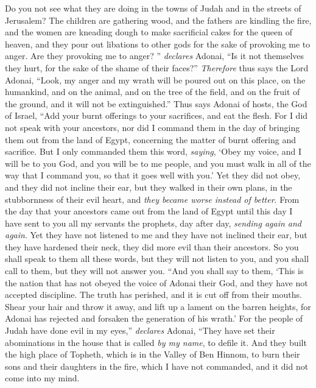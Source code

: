 \begin{biblechapter}
\verse Do you not see what they are doing in the towns of Judah and in the streets of Jerusalem?
\verse The children are gathering wood, and the fathers are kindling the fire, and the women are kneading dough to make sacrificial cakes for the queen of heaven, and they pour out libations to other gods for the sake of provoking me to anger.
\verse Are they provoking me to anger? ” \textit{declares} Adonai, “Is it not themselves they hurt, for the sake of the shame of their faces?”
\verse \textit{Therefore} thus says the Lord Adonai, “Look, my anger and my wrath will be poured out on this place, on the humankind, and on the animal, and on the tree of the field, and on the fruit of the ground, and it will not be extinguished.”
\verse Thus says Adonai of hosts, the God of Israel, “Add your burnt offerings to your sacrifices, and eat the flesh.
\verse For I did not speak with your ancestors, nor did I command them in the day of bringing them out from the land of Egypt, concerning the matter of burnt offering and sacrifice.
\verse But I only commanded them this word, \textit{saying}, ‘Obey my voice, and I will be to you God, and you will be to me people, and you must walk in all of the way that I command you, so that it goes well with you.’
\verse Yet they did not obey, and they did not incline their ear, but they walked in their own plans, in the stubbornness of their evil heart, and \textit{they became worse instead of better}.
\verse From the day that your ancestors came out from the land of Egypt until this day I have sent to you all my servants the prophets, day after day, \textit{sending again and again}.
\verse Yet they have not listened to me and they have not inclined their ear, but they have hardened their neck, they did more evil than their ancestors.
\verse So you shall speak to them all these words, but they will not listen to you, and you shall call to them, but they will not answer you.
 “And you shall say to them, ‘This is the nation that has not obeyed the voice of Adonai their God, and they have not accepted discipline. The truth has perished, and it is cut off from their mouths.
\verse Shear your hair and throw it away, and lift up a lament on the barren heights, for Adonai has rejected and forsaken the generation of his wrath.’
\verse For the people  of Judah have done evil in my eyes,” \textit{declares} Adonai, “They have set their abominations in the house that is called \textit{by my name}, to defile it.
\verse And they built the high place of Topheth, which is in the Valley of Ben Hinnom, to burn their sons and their daughters in the fire, which I have not commanded, and it did not come into my mind.

\end{biblechapter}
